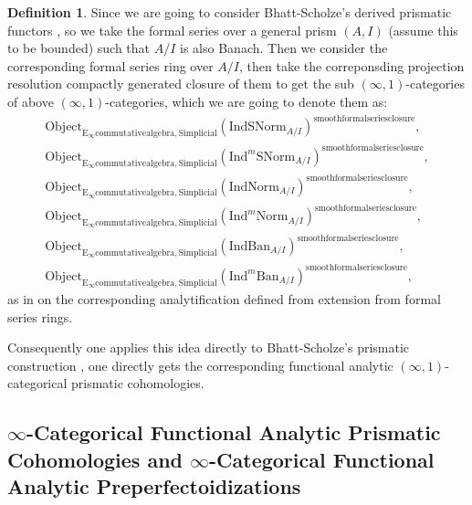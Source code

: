 \documentclass[11pt]{book}
\theoremstyle{definition}
\newtheorem{definition}[theorem]{Definition}
\numberwithin{equation}{section}
\begin{document}
\begin{definition}
Since we are going to consider Bhatt-Scholze's derived prismatic functors \cite[Construction 7.6]{12BS}, so we take the formal series over a general prism $(A,I)$ (assume this to be bounded) such that $A/I$ is also Banach. Then we consider the corresponding formal series ring over $A/I$, then take the correponsding projection resolution compactly generated closure of them to get the sub $(\infty,1)$-categories of above $(\infty,1)$-categories, which we are going to denote them as:
\begin{align}
\mathrm{Object}_{\mathrm{E}_\infty\mathrm{commutativealgebra},\mathrm{Simplicial}}(\mathrm{IndSNorm}_{A/I})^{\text{smoothformalseriesclosure}},\\
\mathrm{Object}_{\mathrm{E}_\infty\mathrm{commutativealgebra},\mathrm{Simplicial}}(\mathrm{Ind}^m\mathrm{SNorm}_{A/I})^{\text{smoothformalseriesclosure}},\\
\mathrm{Object}_{\mathrm{E}_\infty\mathrm{commutativealgebra},\mathrm{Simplicial}}(\mathrm{IndNorm}_{A/I})^{\text{smoothformalseriesclosure}},\\
\mathrm{Object}_{\mathrm{E}_\infty\mathrm{commutativealgebra},\mathrm{Simplicial}}(\mathrm{Ind}^m\mathrm{Norm}_{A/I})^{\text{smoothformalseriesclosure}},\\
\mathrm{Object}_{\mathrm{E}_\infty\mathrm{commutativealgebra},\mathrm{Simplicial}}(\mathrm{IndBan}_{A/I})^{\text{smoothformalseriesclosure}},\\
\mathrm{Object}_{\mathrm{E}_\infty\mathrm{commutativealgebra},\mathrm{Simplicial}}(\mathrm{Ind}^m\mathrm{Ban}_{A/I})^{\text{smoothformalseriesclosure}},
\end{align}	
as in \cite[Section 4.2]{BBM} on the corresponding analytification defined from extension from formal series rings.\\
\end{definition}


\indent Consequently one applies this idea directly to Bhatt-Scholze's prismatic construction \cite{12BS}, one directly gets the corresponding functional analytic $(\infty,1)$-categorical prismatic cohomologies.

\newpage


\subsection{$\infty$-Categorical Functional Analytic Prismatic Cohomologies and $\infty$-Categorical Functional Analytic Preperfectoidizations}
\end{document}

